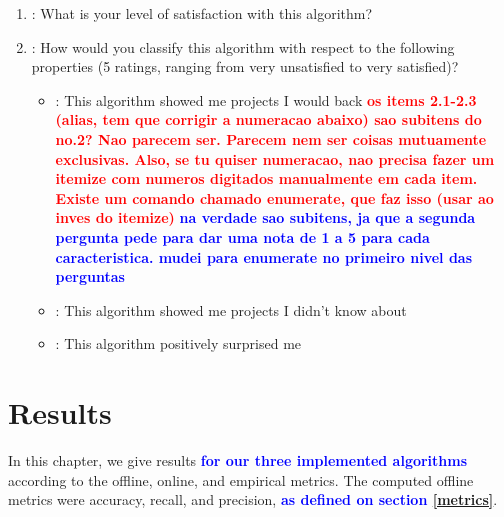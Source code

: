 \documentclass[cic,tc,english]{iiufrgs}
\newcommand{\bruno}[1]{\textcolor{red}{\textbf{#1}}}
\newcommand{\adriano}[1]{\textcolor{blue}{\textbf{#1}}}
\begin{document}
\begin{enumerate}
    \item: What is your level of satisfaction with this algorithm?
    \item: How would you classify this algorithm with respect to the following properties (5 ratings, ranging from very unsatisfied to very satisfied)?
    \begin {itemize}
    \item: This algorithm showed me projects I would back \bruno{os items 2.1-2.3 (alias, tem que corrigir a numeracao abaixo) sao subitens do no.2? Nao parecem ser. Parecem nem ser coisas mutuamente exclusivas. Also, se tu quiser numeracao, nao precisa fazer um itemize com numeros digitados manualmente em cada item. Existe um comando chamado enumerate, que faz isso (usar ao inves do itemize)} \adriano{na verdade sao subitens, ja que a segunda pergunta pede para dar uma nota de 1 a 5 para cada caracteristica. mudei para enumerate no primeiro nivel das perguntas}
    \item: This algorithm showed me projects I didn't know about
    \item: This algorithm positively surprised me 
    \end{itemize}
\end{enumerate}




\chapter{Results} \label{results}
In this chapter, we give results \adriano{for our three implemented algorithms} according to the offline, online, and empirical metrics. The computed offline metrics were accuracy, recall, and precision, \adriano{as defined on section \ref{metrics}}.
\end{document}
